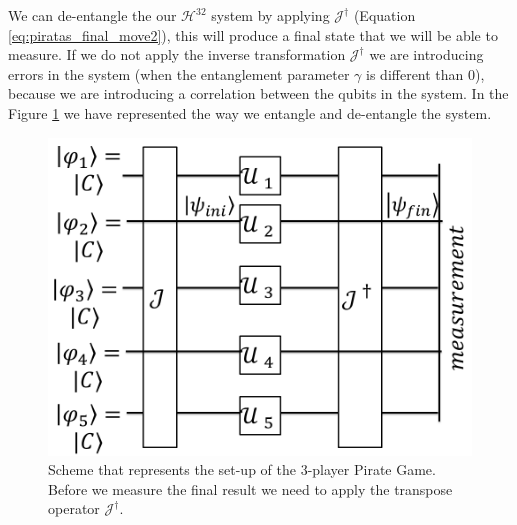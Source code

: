 We can de-entangle the our $\mathcal{H}^{32}$ system by applying $\mathcal{J}^{\dagger}$ (Equation \ref{eq:piratas_final_move2}), this will produce a final state that we will be able to measure. If we do not apply the inverse transformation $\mathcal{J}^{\dagger}$ we are introducing errors in the system (when the entanglement parameter $\gamma$ is different than $0$), because we are introducing a correlation between the qubits in the system. In the Figure \ref{fig:pg_architecture3players} we have represented the way we entangle and de-entangle the system.


\begin{figure}[h]
\centering 
\includegraphics[scale=0.35]{Figures/architecture/esquema/esquema.png}
\caption{Scheme that represents the set-up of the $3$-player Pirate Game. Before we measure the final result we need to apply the transpose operator $\mathcal{J}^{\dagger}$. }
\label{fig:pg_architecture3players}
\end{figure}



